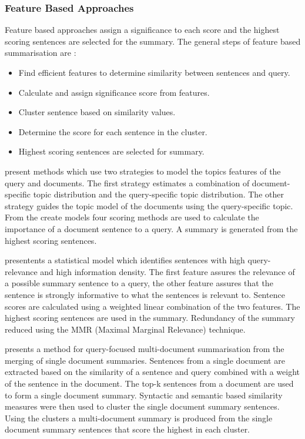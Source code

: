 \subsubsection{Feature Based Approaches}
Feature based approaches assign a significance to each score and the highest scoring sentences are selected for the summary. The general steps of feature based summarisation are \citep{rahman2015survey}:

\begin{itemize}
      \item Find efficient features to determine similarity between sentences and query.
      \item Calculate and assign significance score from features.
      \item Cluster sentence based on similarity values.
      \item Determine the score for each sentence in the cluster.
      \item Highest scoring sentences are selected for summary.
\end{itemize}

\citet{tang2009multi} present methods which use two strategies to model the topics features of the query and documents. The first strategy estimates a combination of document-specific topic distribution and the query-specific topic distribution. The other strategy guides the topic model of the documents using the query-specific topic. From the create models four scoring methods are used to calculate the importance of a document sentence to a query. A summary is generated from the highest scoring sentences. 

\citet{ye2008query} presentents a statistical model which identifies sentences with high query-relevance and high information density. The first feature assures the relevance of a possible summary sentence to a query, the other feature assures that the sentence is strongly informative to what the sentences is relevant to. Sentence scores are calculated using a weighted linear combination of the two features. The highest scoring sentences are used in the summary. Redundancy of the summary reduced using the MMR (Maximal Marginal Relevance) technique. 

\citet{gupta2012multi} presents a method for query-focused multi-document summarisation from the merging of single document summaries. Sentences from a single document are extracted based on the similarity of a sentence and query combined with a weight of the sentence in the document. The top-k sentences from a document are used to form a single document summary. Syntactic and semantic based similarity measures were then used to cluster the single document summary sentences. Using the clusters a multi-document summary is produced from the single document summary sentences that score the highest in each cluster.


